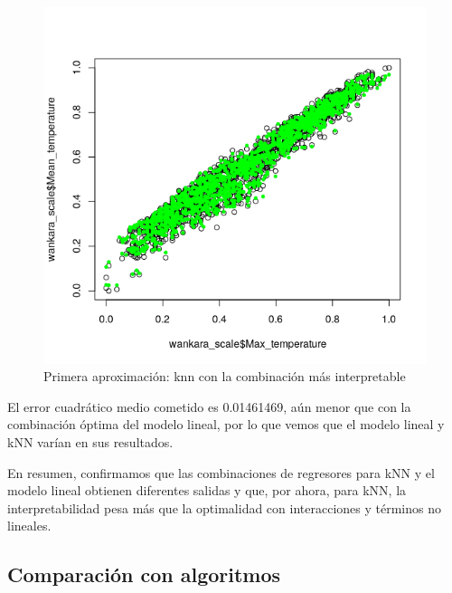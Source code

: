 \begin{itemize}
	\begin{figure}[H] %
		\centering
		\includegraphics[scale=0.5]{knn3.png}  %
		\caption{Primera aproximación: knn con la combinación más interpretable} 
		\label{fig:knn3}
	\end{figure}
	
	El error cuadrático medio cometido es 0.01461469, aún menor que con la combinación óptima del modelo lineal, por lo que vemos que el modelo lineal y kNN varían en sus resultados. 
\end{itemize} 

	En resumen, confirmamos que las combinaciones de regresores para kNN y el modelo lineal obtienen diferentes salidas y que, por ahora, para kNN, la interpretabilidad pesa más que la optimalidad con interacciones y términos no lineales.

\subsection{Comparación con algoritmos}


 

\newpage



